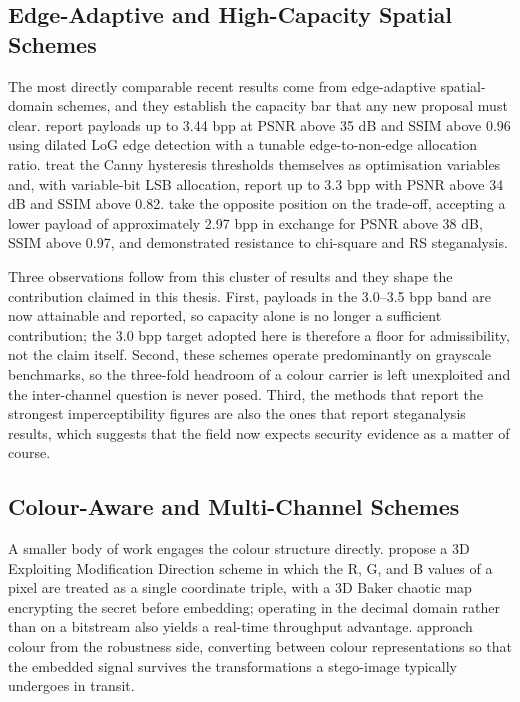 \subsection{Edge-Adaptive and High-Capacity Spatial Schemes}
The most directly comparable recent results come from edge-adaptive spatial-domain schemes, and they establish the capacity bar that any new proposal must clear. \citet{patwari2025dilatedlog} report payloads up to 3.44 bpp at PSNR above 35 dB and SSIM above 0.96 using dilated LoG edge detection with a tunable edge-to-non-edge allocation ratio. \citet{singh2026edgeopt} treat the Canny hysteresis thresholds themselves as optimisation variables and, with variable-bit LSB allocation, report up to 3.3 bpp with PSNR above 34 dB and SSIM above 0.82. \citet{ismail2026edgeadaptive} take the opposite position on the trade-off, accepting a lower payload of approximately 2.97 bpp in exchange for PSNR above 38 dB, SSIM above 0.97, and demonstrated resistance to chi-square and RS steganalysis.

Three observations follow from this cluster of results and they shape the contribution claimed in this thesis. First, payloads in the 3.0--3.5 bpp band are now attainable and reported, so capacity alone is no longer a sufficient contribution; the 3.0 bpp target adopted here is therefore a floor for admissibility, not the claim itself. Second, these schemes operate predominantly on grayscale benchmarks, so the three-fold headroom of a colour carrier is left unexploited and the inter-channel question is never posed. Third, the methods that report the strongest imperceptibility figures are also the ones that report steganalysis results, which suggests that the field now expects security evidence as a matter of course.

\subsection{Colour-Aware and Multi-Channel Schemes}
A smaller body of work engages the colour structure directly. \citet{aljburi2026emd3d} propose a 3D Exploiting Modification Direction scheme in which the R, G, and B values of a pixel are treated as a single coordinate triple, with a 3D Baker chaotic map encrypting the secret before embedding; operating in the decimal domain rather than on a bitstream also yields a real-time throughput advantage. \citet{li2025colorconversion} approach colour from the robustness side, converting between colour representations so that the embedded signal survives the transformations a stego-image typically undergoes in transit.

